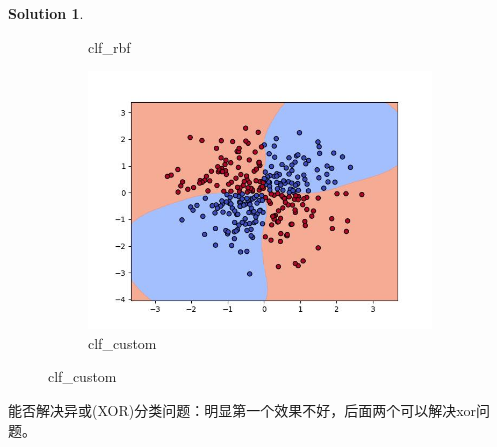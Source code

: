 \documentclass[a4paper,UTF8]{article}
\numberwithin{equation}{section}
\theoremstyle{definition}
\newtheorem*{solution}{Solution}
\begin{document}
\begin{solution}
\begin{figure}[h]
\begin{subfigure}[b]{0.3\textwidth}
            \caption{clf\_rbf}
        \end{subfigure}
        \begin{subfigure}[b]{0.3\textwidth}
            \includegraphics[width=\textwidth]{clf_custom.jpg}
            \caption{clf\_custom}
        \end{subfigure}
    \end{figure}
        
    能否解决异或(XOR)分类问题：明显第一个效果不好，后面两个可以解决xor问题。
\end{solution}

\newpage
\end{document}
